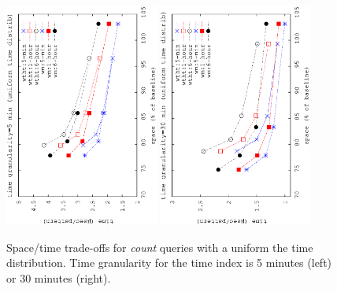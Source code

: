 	\begin{figure}[ht]
		\begin{center}
			\includegraphics[angle=-90,width=0.45\textwidth]{figures_synt/unif5m.eps}
			\includegraphics[angle=-90,width=0.45\textwidth]{figures_synt/unif30m.eps}
			\caption{Space/time trade-offs for {\em count} queries with a uniform the time distribution.
				Time granularity for the time index is 5 minutes (left) or 30 minutes (right).
			}
			\label{fig:ctr:exp:queries:wt:unif}
		\end{center}
	\end{figure}
	
